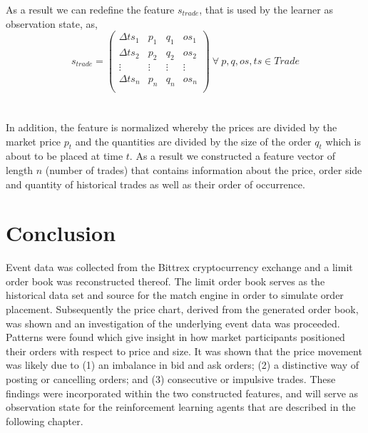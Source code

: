 As a result we can redefine the feature $s_{trade}$, that is used by the learner as observation state, as,
\begin{equation}
    s_{trade} =\begin{pmatrix}
        \Delta{ts_1} & p_1 & q_1 & os_1 \\
        \Delta{ts_2} & p_2 & q_2 & os_2 \\
        \vdots & \vdots & \vdots & \vdots\\
        \Delta{ts_n} & p_n & q_n & os_n \\
    \end{pmatrix}
    \ \forall \ p, q, os, ts \in Trade
\end{equation}
\hfill
\\
\\
In addition, the feature is normalized whereby the prices are divided by the market price $p_t$ and the quantities are divided by the size of the order $q_t$ which is about to be placed at time $t$.
As a result we constructed a feature vector of length $n$ (number of trades) that contains information about the price, order side and quantity of historical trades as well as their order of occurrence.

\section{Conclusion}

Event data was collected from the Bittrex cryptocurrency exchange and a limit order book was reconstructed thereof.
The limit order book serves as the historical data set and source for the match engine in order to simulate order placement. 
Subsequently the price chart, derived from the generated order book, was shown and an investigation of the underlying event data was proceeded.
Patterns were found which give insight in how market participants positioned their orders with respect to price and size.
It was shown that the price movement was likely due to (1) an imbalance in bid and ask orders; (2) a distinctive way of posting or cancelling orders; and (3) consecutive or impulsive trades.
These findings were incorporated within the two constructed features, and will serve as observation state for the reinforcement learning agents that are described in the following chapter.